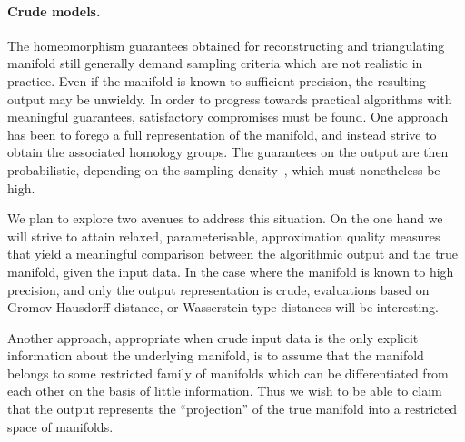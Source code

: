 \paragraph{Crude models.}

The homeomorphism guarantees obtained for reconstructing and
triangulating manifold still generally demand sampling criteria which
are not realistic in practice. Even if the manifold is known to
sufficient precision, the resulting output may be
unwieldy. In order to progress towards practical algorithms with
meaningful guarantees, satisfactory compromises must be found. 
%
One approach has been to forego a full representation of the manifold,
and instead strive to obtain the associated homology groups. The
guarantees on the output are then probabilistic, depending on the
sampling density~\cite{nsw-fhm-2008}, which must nonetheless be high.

We plan to explore two avenues to address this situation. On the one
hand we will strive to attain relaxed, parameterisable, approximation quality
measures that yield a meaningful comparison between the algorithmic
output and the true manifold, given the input data. In the case where
the manifold is known to high precision, and only the output
representation is crude, evaluations based on Gromov-Hausdorff
distance, or Wasserstein-type distances will be interesting.

Another approach, appropriate when crude input data is the only
explicit information about the underlying manifold, is to assume that
the manifold belongs to some restricted family of manifolds which can
be differentiated from each other on the basis of little
information. Thus we wish to be able to claim that the output
represents the ``projection'' of the true manifold into a restricted
space of manifolds.

